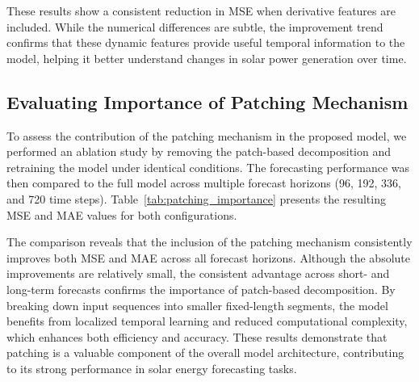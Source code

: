 \documentclass[12pt]{uomthesis}
\begin{document}
These results show a consistent reduction in MSE when derivative features are included. While the numerical differences are subtle, the improvement trend confirms that these dynamic features provide useful temporal information to the model, helping it better understand changes in solar power generation over time.

\subsection{Evaluating Importance of Patching Mechanism}
To assess the contribution of the patching mechanism in the proposed model, we performed an ablation study by removing the patch-based decomposition and retraining the model under identical conditions. The forecasting performance was then compared to the full model across multiple forecast horizons (96, 192, 336, and 720 time steps). Table~\ref{tab:patching_importance} presents the resulting MSE and MAE values for both configurations.

\begin{table}[ht]
\centering
\caption{Impact of patching mechanism on forecasting performance (MSE) across different forecast horizons.}
\label{tab:patching_importance}
\end{table}



The comparison reveals that the inclusion of the patching mechanism consistently improves both MSE and MAE across all forecast horizons. Although the absolute improvements are relatively small, the consistent advantage across short- and long-term forecasts confirms the importance of patch-based decomposition. By breaking down input sequences into smaller fixed-length segments, the model benefits from localized temporal learning and reduced computational complexity, which enhances both efficiency and accuracy. These results demonstrate that patching is a valuable component of the overall model architecture, contributing to its strong performance in solar energy forecasting tasks.
\end{document}
